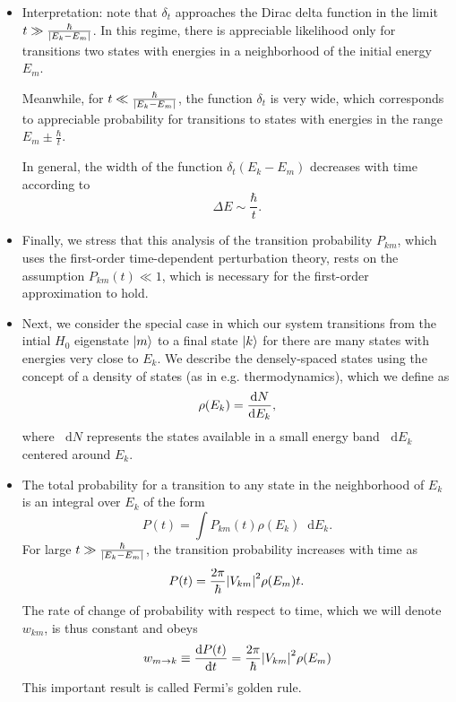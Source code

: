 \documentclass[11pt, a4paper]{article}
\newcommand{\diff}{\mathop{}\!\mathrm{d}} %
\begin{document}
\begin{itemize}
    \item Interpretation: note that $ \delta_{t} $ approaches the Dirac delta function in the limit $ t \gg \frac{\hbar}{\abs{E_{k} - E_{m}}} $. In this regime, there is appreciable likelihood only for transitions two states with energies in a neighborhood of the initial energy $ E_{m} $.

    Meanwhile, for $  t \ll \frac{\hbar}{\abs{E_{k} - E_{m}}}  $, the function $ \delta_{t} $ is very wide, which corresponds to appreciable probability for transitions to states with energies in the range $ E_{m} \pm \frac{\hbar}{t} $.

    In general, the width of the function $ \delta_{t}(E_{k} - E_{m}) $ decreases with time according to
    \begin{equation*}
        \Delta E \sim \frac{\hbar}{t}.
    \end{equation*}
    
    \item Finally, we stress that this analysis of the transition probability $ P_{km} $, which uses the first-order time-dependent perturbation theory, rests on the assumption $ P_{km}(t) \ll 1 $, which is necessary for the first-order approximation to hold.

    \item Next, we consider the special case in which our system transitions from the intial $ H_{0} $ eigenstate $ \ket{m} $ to a final state $ \ket{k} $ for there are many states with energies very close to $ E_{k} $. We describe the densely-spaced states using the concept of a density of states (as in e.g. thermodynamics), which we define as
    \begin{equation*}
        \rho(E_{k}) = \dv{N}{E_{k}},
    \end{equation*}
    where $ \diff N $ represents the states available in a small energy band $ \diff E_{k} $ centered around $ E_{k} $. 

    \item The total probability for a transition to any state in the neighborhood of $ E_{k} $ is an integral over $ E_{k} $ of the form
    \begin{equation*}
        P(t) = \int P_{km}(t)\rho(E_{k})\diff E_{k}.
    \end{equation*}
    For large $ t \gg \frac{\hbar}{\abs{E_{k} - E_{m}}} $, the transition probability increases with time as
    \begin{equation*}
        P(t) = \frac{2\pi}{\hbar} \abs{V_{km}}^{2}\rho(E_{m})t.
    \end{equation*}
    The rate of change of probability with respect to time, which we will denote $ w_{km} $, is thus constant and obeys
    \begin{equation*}
        w_{m \to k} \equiv \dv{P(t)}{t} = \frac{2\pi}{\hbar} \abs{V_{km}}^{2}\rho(E_{m})
    \end{equation*}
    This important result is called Fermi's golden rule.
    
\end{itemize}
\end{document}

